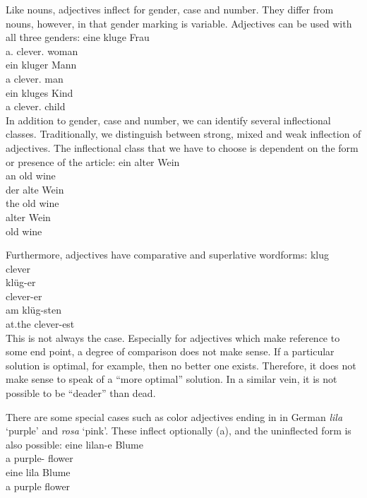 Like nouns, adjectives inflect for gender, case and number. They differ from nouns, however, in that
gender marking is variable. Adjectives can be used with all three genders:
\eal
\ex 
\gll eine kluge Frau\\
	 a.\fem{} clever.\fem{} woman\\
\ex 
\gll ein kluger Mann\\
	 a clever.\mas{} man\\
\ex 
\gll ein kluges Kind\\
	 a clever.\neu{} child\\
\zl
In addition to gender, case and number, we can identify several inflectional classes. Traditionally, we distinguish between strong, mixed and weak 
inflection of adjectives. The inflectional class\label{page-Flexionsklasse-Wunderlich} that we have to choose is dependent on the 
form or presence of the article:
\eal
\ex 
\gll ein alter Wein\\
     an old wine\\
\ex
\gll der alte Wein\\
     the old wine\\
\ex 
\gll alter Wein\\
     old wine\\
\zl



Furthermore, adjectives have comparative and superlative wordforms:
\eal
\ex 
\gll klug\\
     clever\\
\ex 
\gll klüg-er\\
     clever-er\\
\ex 
\gll am klüg-sten\\
     at.the clever-est\\
\zl
This is not always the case. Especially for adjectives which make reference to some end point, a degree of comparison does not make sense.
If a particular solution is optimal, for example, then no better one exists.
Therefore, it does not make sense to speak of a ``more optimal'' solution. In a similar vein, it is not possible to
be ``deader'' than dead.

There are some special cases such as color adjectives ending in  in German \emph{lila} `purple' and \emph{rosa} `pink'.
These inflect optionally (a), and the uninflected form is also possible:
\eal
\ex 
\gll eine lilan-e Blume\\
	 a purple-\fem{} flower\\
\ex 
\gll eine lila Blume\\
	 a purple flower\\
\zl

